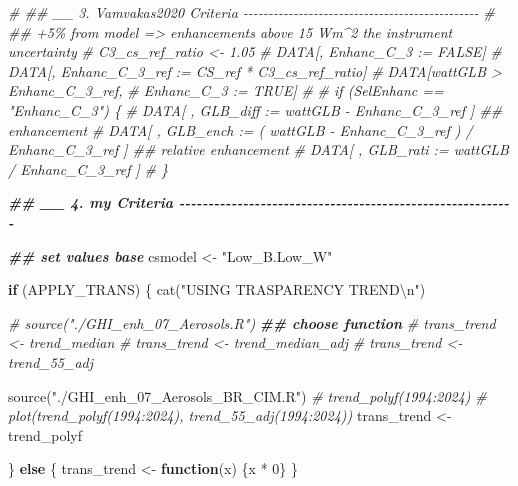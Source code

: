\documentclass[
  10pt,
  a4paper,oneside]{article}
\newenvironment{Shaded}{\begin{snugshade}}{\end{snugshade}}
\newcommand{\CommentTok}[1]{\textcolor[rgb]{0.56,0.35,0.01}{\textit{#1}}}
\newcommand{\ControlFlowTok}[1]{\textcolor[rgb]{0.13,0.29,0.53}{\textbf{#1}}}
\newcommand{\DecValTok}[1]{\textcolor[rgb]{0.00,0.00,0.81}{#1}}
\newcommand{\DocumentationTok}[1]{\textcolor[rgb]{0.56,0.35,0.01}{\textbf{\textit{#1}}}}
\newcommand{\FunctionTok}[1]{\textcolor[rgb]{0.00,0.00,0.00}{#1}}
\newcommand{\NormalTok}[1]{#1}
\newcommand{\OtherTok}[1]{\textcolor[rgb]{0.56,0.35,0.01}{#1}}
\newcommand{\SpecialCharTok}[1]{\textcolor[rgb]{0.00,0.00,0.00}{#1}}
\newcommand{\StringTok}[1]{\textcolor[rgb]{0.31,0.60,0.02}{#1}}
\begin{document}
\begin{Shaded}
\begin{Highlighting}[]
\CommentTok{\# \#\# \_\_ 3. Vamvakas2020  Criteria  {-}{-}{-}{-}{-}{-}{-}{-}{-}{-}{-}{-}{-}{-}{-}{-}{-}{-}{-}{-}{-}{-}{-}{-}{-}{-}{-}{-}{-}{-}{-}{-}{-}{-}{-}{-}{-}{-}{-}{-}{-}{-}{-}{-}{-}{-}{-}}
\CommentTok{\# \#\# +5\% from model =\textgreater{} enhancements above 15 Wm\^{}2 the instrument uncertainty}
\CommentTok{\# C3\_cs\_ref\_ratio \textless{}{-} 1.05}
\CommentTok{\# DATA[, Enhanc\_C\_3 := FALSE]}
\CommentTok{\# DATA[, Enhanc\_C\_3\_ref := CS\_ref * C3\_cs\_ref\_ratio]}
\CommentTok{\# DATA[wattGLB \textgreater{} Enhanc\_C\_3\_ref,}
\CommentTok{\#      Enhanc\_C\_3 := TRUE]}
\CommentTok{\#}
\CommentTok{\# if (SelEnhanc == "Enhanc\_C\_3") \{}
\CommentTok{\#   DATA[ , GLB\_diff :=   wattGLB {-} Enhanc\_C\_3\_ref                    ] \#\# enhancement}
\CommentTok{\#   DATA[ , GLB\_ench := ( wattGLB {-} Enhanc\_C\_3\_ref ) / Enhanc\_C\_3\_ref ] \#\# relative enhancement}
\CommentTok{\#   DATA[ , GLB\_rati :=   wattGLB / Enhanc\_C\_3\_ref                    ]}
\CommentTok{\# \}}



\DocumentationTok{\#\# \_\_ 4. my Criteria  {-}{-}{-}{-}{-}{-}{-}{-}{-}{-}{-}{-}{-}{-}{-}{-}{-}{-}{-}{-}{-}{-}{-}{-}{-}{-}{-}{-}{-}{-}{-}{-}{-}{-}{-}{-}{-}{-}{-}{-}{-}{-}{-}{-}{-}{-}{-}{-}{-}{-}{-}{-}{-}{-}{-}{-}{-}{-}}

\DocumentationTok{\#\# set values base}
\NormalTok{csmodel }\OtherTok{\textless{}{-}} \StringTok{"Low\_B.Low\_W"}



\ControlFlowTok{if}\NormalTok{ (APPLY\_TRANS) \{}
  \FunctionTok{cat}\NormalTok{(}\StringTok{"USING TRASPARENCY TREND}\SpecialCharTok{\textbackslash{}n}\StringTok{"}\NormalTok{)}

  \CommentTok{\# source("./GHI\_enh\_07\_Aerosols.R")}
  \DocumentationTok{\#\# choose function}
  \CommentTok{\# trans\_trend \textless{}{-} trend\_median}
  \CommentTok{\# trans\_trend \textless{}{-} trend\_median\_adj}
  \CommentTok{\# trans\_trend \textless{}{-} trend\_55\_adj}

  \FunctionTok{source}\NormalTok{(}\StringTok{"./GHI\_enh\_07\_Aerosols\_BR\_CIM.R"}\NormalTok{)}
  \CommentTok{\# trend\_polyf(1994:2024)}
  \CommentTok{\# plot(trend\_polyf(1994:2024), trend\_55\_adj(1994:2024))}
\NormalTok{  trans\_trend }\OtherTok{\textless{}{-}}\NormalTok{ trend\_polyf}

\NormalTok{\} }\ControlFlowTok{else}\NormalTok{ \{}
\NormalTok{  trans\_trend }\OtherTok{\textless{}{-}} \ControlFlowTok{function}\NormalTok{(x) \{x }\SpecialCharTok{*} \DecValTok{0}\NormalTok{\}}
\NormalTok{\}}
\end{Highlighting}
\end{Shaded}
\end{document}
